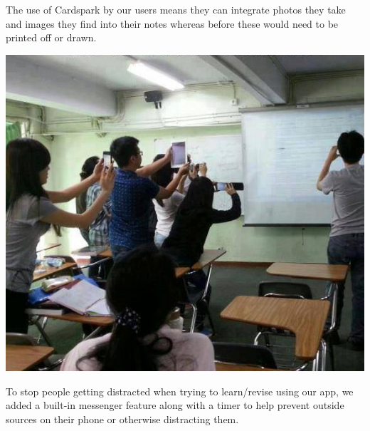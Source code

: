 \documentclass{article}
\begin{document}
The use of Cardspark by our users means they can integrate photos they take and images they find into their notes whereas before these would need to be printed off or drawn.


\begin{center}
	\vspace{1mm}
	\includegraphics[scale=0.5]{camera.jpg}
	\vspace{1mm}
\end{center}

To stop people getting distracted when trying to learn/revise using our app, we added a built-in messenger feature along with a timer to help prevent outside sources on their phone or otherwise distracting them.
\end{document}
